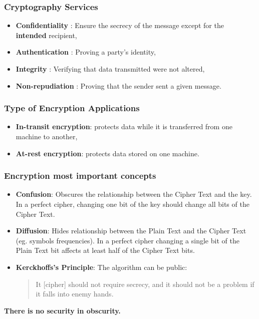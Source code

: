 \documentclass{beamer}
\begin{document}
\begin{frame}
        \frametitle{Cryptography Services}

        \begin{itemize}
          \item {\bf Confidentiality }: Ensure the secrecy of the message except for
            the {\bf intended } recipient,
          \item {\bf Authentication }: Proving a party's identity,
          \item {\bf Integrity }: Verifying that data transmitted were not altered,
          \item {\bf Non-repudiation }: Proving that the sender sent a given message.
        \end{itemize}

\end{frame}

\begin{frame}
        \frametitle{Type of Encryption Applications}

        \begin{itemize}
          \item {\bf In-transit encryption}: protects data while it is
            transferred from one machine to another,
          \item {\bf At-rest encryption}: protects data stored on one machine.
        \end{itemize}

\end{frame}

\begin{frame}
        \frametitle{Encryption most important concepts}

        \begin{itemize}

          \item {\bf Confusion}: Obscures the relationship between the Cipher
            Text and the key. In a perfect cipher, changing one bit of the key
            should change all bits of the Cipher Text.

          \item {\bf Diffusion}: Hides relationship between the Plain Text and the
            Cipher Text (eg. symbols frequencies). In a perfect cipher changing
            a single bit of the Plain Text bit affects at least half of the Cipher Text bits.

          \item {\bf Kerckhoffs's Principle}: The algorithm can be public:

        \begin{quote}
          It [cipher] should not require secrecy, and it should not be a problem if it falls into enemy hands.
        \end{quote}

        \end{itemize}


        \vspace{5 mm}
\center
        {  \bf There is no security in obscurity.}

\end{frame}
\end{document}
